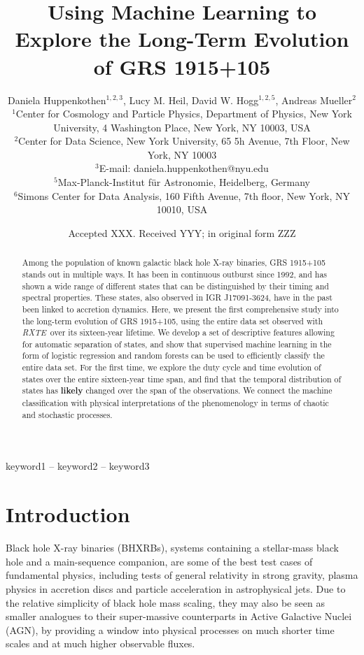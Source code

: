 \documentclass[fleqn,usenatbib]{mnras}
\title[The Long-Term Evolution of GRS 1915+105]{Using Machine Learning to Explore the Long-Term Evolution of GRS 1915+105}
\author[D. Huppenkothen et al.]{Daniela Huppenkothen$^{1, 2, 3}$, Lucy M. Heil, David W. Hogg$^{1,2,5}$, Andreas Mueller$^{2}$
\\
   $^{1}$Center for Cosmology and Particle Physics, Department of Physics, New York University, 4 Washington Place, New York, NY 10003, USA \\
  $^{2}$Center for Data Science, New York University, 65 5h Avenue, 7th Floor, New York, NY 10003 \\
 $^{3}$E-mail: daniela.huppenkothen@nyu.edu \\
  $^{5}$Max-Planck-Institut f\"{u}r Astronomie, Heidelberg, Germany \\
  $^{6}$Simons Center for Data Analysis, 160 Fifth Avenue, 7th floor, New York, NY 10010, USA
}
\date{Accepted XXX. Received YYY; in original form ZZZ}
\newcommand{\project}[1]{\textsl{#1}}
\newcommand{\rxte}{\project{RXTE}}
\begin{document}
\label{firstpage}
\pagerange{\pageref{firstpage}--\pageref{lastpage}}
\maketitle

\begin{abstract}
Among the population of known galactic black hole X-ray binaries, GRS 1915+105 stands out in multiple ways. It has been in continuous outburst since 1992, and has shown a wide range of different states that can be distinguished by their timing and spectral properties. These states, also observed in IGR J17091-3624, have in the past been linked to accretion dynamics. %
Here, we present the first comprehensive study into the long-term evolution of GRS 1915+105, using the entire data set observed with \rxte\ over its sixteen-year lifetime. We develop a set of descriptive features allowing for automatic separation of states, and show that supervised machine learning in the form of logistic regression and random forests can be used to efficiently classify the entire data set. For the first time, we explore the duty cycle and time evolution of states over the entire sixteen-year time span, and find that the temporal distribution of states has \textbf{likely} changed over the span of the observations. We connect the machine classification with physical interpretations of the phenomenology in terms of chaotic and stochastic processes.
\end{abstract}

\begin{keywords}
keyword1 -- keyword2 -- keyword3
\end{keywords}



\section{Introduction}
Black hole X-ray binaries (BHXRBs), systems containing a stellar-mass black hole and a main-sequence companion, are some of the best test cases of fundamental physics, including tests of general relativity in strong gravity, plasma physics in accretion discs and particle acceleration in astrophysical jets. 
Due to the relative simplicity of black hole mass scaling, they may also be seen as smaller analogues to their super-massive counterparts in Active Galactive Nuclei (AGN), by providing a window into physical processes on much shorter time scales and at much higher observable fluxes.
\end{document}
